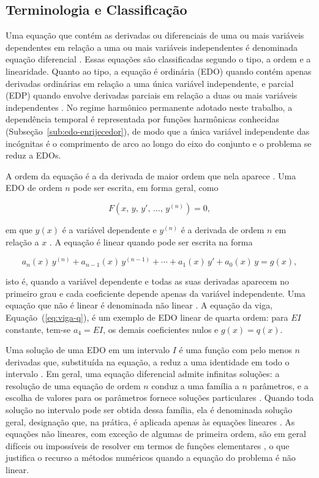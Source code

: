 \documentclass[arial,centeredequations,english,brazilian,oneside,section=TITLE]{ifes8}
\begin{document}
\subsection{Terminologia e Classificação}
\label{sub:edo-classificacao}
 
Uma equação que contém as derivadas ou diferenciais de uma ou mais variáveis
dependentes em relação a uma ou mais variáveis independentes é denominada equação
diferencial \cite{Zill2001v1}. Essas equações são classificadas segundo o tipo, a
ordem e a linearidade. Quanto ao tipo, a equação é ordinária (EDO) quando contém apenas
derivadas ordinárias em relação a uma única variável independente, e parcial (EDP)
quando envolve derivadas parciais em relação a duas ou mais variáveis independentes
\cite{Zill2001v1}. No regime harmônico permanente adotado neste trabalho, a
dependência temporal é representada por funções harmônicas conhecidas
(Subseção~\ref{sub:edo-enrijecedor}), de modo que a única variável independente das
incógnitas é o comprimento de arco ao longo do eixo do conjunto e o problema se reduz a
EDOs.
 
A ordem da equação é a da derivada de maior ordem que nela aparece
\cite{Zill2001v1}. Uma EDO de ordem $n$ pode ser escrita, em forma geral, como

\begin{equation}
  \label{eq:edo-geral}
  F\!\left(x,\, y,\, y',\, \ldots,\, y^{(n)}\right) = 0,
\end{equation}

em que $y(x)$ é a variável dependente e $y^{(n)}$ é a derivada de ordem $n$ em relação a
$x$ \cite{Zill2001v1}. A equação é linear quando pode ser escrita na forma

\begin{equation}
  \label{eq:edo-linear-n}
  a_n(x)\,y^{(n)} + a_{n-1}(x)\,y^{(n-1)} + \cdots + a_1(x)\,y' + a_0(x)\,y = g(x),
\end{equation}

isto é, quando a variável dependente e todas as suas derivadas aparecem no primeiro grau
e cada coeficiente depende apenas da variável independente. Uma equação que não é linear
é denominada não linear \cite{Zill2001v1}. A equação da viga,
Equação~(\ref{eq:viga-q}), é um exemplo de EDO linear de quarta ordem: para $EI$
constante, tem-se $a_4 = EI$, os demais coeficientes nulos e $g(x) = q(x)$.
 
Uma solução de uma EDO em um intervalo $I$ é uma função com pelo menos $n$ derivadas
que, substituída na equação, a reduz a uma identidade em todo o intervalo
\cite{Zill2001v1}. Em geral, uma equação diferencial admite infinitas soluções:
a resolução de uma equação de ordem $n$ conduz a uma família a $n$ parâmetros, e a
escolha de valores para os parâmetros fornece soluções particulares
\cite{Zill2001v1}. Quando toda solução no intervalo pode ser obtida dessa
família, ela é denominada solução geral, designação que, na prática, é aplicada apenas
às equações lineares \cite{Zill2001v1}. As equações não lineares, com exceção de
algumas de primeira ordem, são em geral difíceis ou impossíveis de resolver em termos
de funções elementares \cite{Zill2001v1}, o que justifica o recurso a métodos
numéricos quando a equação do problema é não linear.
 
\end{document}
